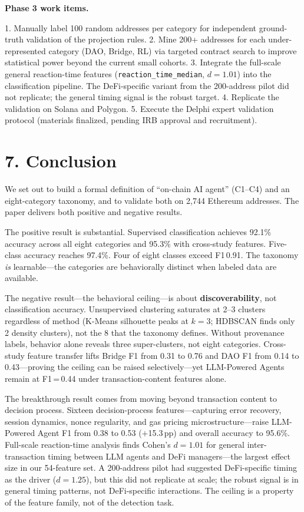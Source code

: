 \documentclass[sigconf,nonacm=false]{acmart}
\begin{document}
\textbf{Phase 3 work items.}

1. Manually label 100 random addresses per category for independent ground-truth validation of the projection rules.
2. Mine 200+ addresses for each under-represented category (DAO, Bridge, RL) via targeted contract search to improve statistical power beyond the current small cohorts.
3. Integrate the full-scale general reaction-time features (\texttt{reaction\_time\_median}, $d{=}1.01$) into the classification pipeline. The DeFi-specific variant from the 200-address pilot did not replicate; the general timing signal is the robust target.
4. Replicate the validation on Solana and Polygon.
5. Execute the Delphi expert validation protocol (materials finalized, pending IRB approval and recruitment).


\section{7. Conclusion}

We set out to build a formal definition of ``on-chain AI agent'' (C1--C4) and an eight-category taxonomy, and to validate both on 2,744 Ethereum addresses. The paper delivers both positive and negative results.

The positive result is substantial. Supervised classification achieves 92.1\% accuracy across all eight categories and 95.3\% with cross-study features. Five-class accuracy reaches 97.4\%. Four of eight classes exceed F1\,0.91. The taxonomy \emph{is} learnable---the categories are behaviorally distinct when labeled data are available.

The negative result---the behavioral ceiling---is about \textbf{discoverability}, not classification accuracy. Unsupervised clustering saturates at 2--3 clusters regardless of method (K-Means silhouette peaks at $k{=}3$; HDBSCAN finds only 2 density clusters), not the 8 that the taxonomy defines. Without provenance labels, behavior alone reveals three super-clusters, not eight categories. Cross-study feature transfer lifts Bridge F1 from 0.31 to 0.76 and DAO F1 from 0.14 to 0.43---proving the ceiling can be raised selectively---yet LLM-Powered Agents remain at F1\,=\,0.44 under transaction-content features alone.

The breakthrough result comes from moving beyond transaction content to decision process. Sixteen decision-process features---capturing error recovery, session dynamics, nonce regularity, and gas pricing microstructure---raise LLM-Powered Agent F1 from 0.38 to 0.53 ($+$15.3\,pp) and overall accuracy to 95.6\%. Full-scale reaction-time analysis finds Cohen's $d{=}1.01$ for general inter-transaction timing between LLM agents and DeFi managers---the largest effect size in our 54-feature set. A 200-address pilot had suggested DeFi-specific timing as the driver ($d{=}1.25$), but this did not replicate at scale; the robust signal is in general timing patterns, not DeFi-specific interactions. The ceiling is a property of the feature family, not of the detection task.
\end{document}
